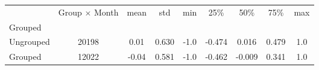 \begin{tabular}{lcccccccc}
\toprule
{} &  Group $\times$ Month &  mean &    std &  min &    25\% &    50\% &    75\% &  max \\
Grouped   &                       &       &        &      &        &        &        &      \\
\midrule
Ungrouped &                 20198 &  0.01 &  0.630 & -1.0 & -0.474 &  0.016 &  0.479 &  1.0 \\
Grouped   &                 12022 & -0.04 &  0.581 & -1.0 & -0.462 & -0.009 &  0.341 &  1.0 \\
\bottomrule
\end{tabular}
